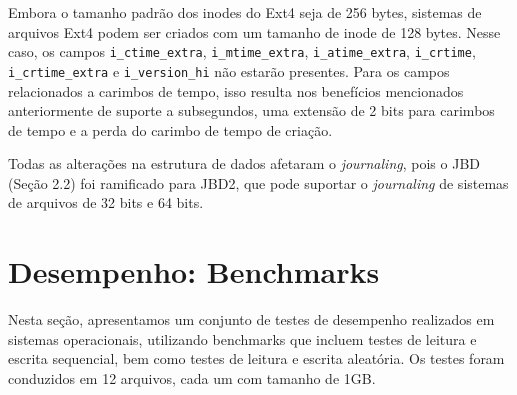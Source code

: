 \documentclass[
	12pt,				%
	openright,			%
	oneside,			%
	a4paper,			%
	chapter=TITLE,		%
	english,			%
	french,				%
	spanish,			%
	brazil				%
	]{abntex2}
\theoremstyle{definition}
\begin{document}
Embora o tamanho padrão dos inodes do Ext4 seja de 256 bytes, sistemas de 
arquivos Ext4 podem ser criados com um tamanho de inode de 128 bytes. Nesse caso, os campos 
\texttt{i\_ctime\_extra}, \texttt{i\_mtime\_extra}, \texttt{i\_atime\_extra}, \texttt{i\_crtime}, 
\texttt{i\_crtime\_extra} e \texttt{i\_version\_hi} não estarão presentes. Para os campos 
relacionados a carimbos de tempo, isso resulta nos benefícios mencionados anteriormente de 
suporte a subsegundos, uma extensão de 2 bits para carimbos de tempo e a perda do carimbo de tempo de criação.

Todas as alterações na estrutura de dados afetaram o \textit{journaling}, pois o JBD (Seção 2.2) 
foi ramificado para JBD2, que pode suportar o \textit{journaling} de sistemas de arquivos de 32 bits e 64 bits.

\chapter{Desempenho: Benchmarks}





\lstset{style=dracula}




Nesta seção, apresentamos um conjunto de testes de desempenho realizados em 
sistemas operacionais, utilizando benchmarks que incluem testes de leitura e 
escrita sequencial, bem como testes de leitura e escrita aleatória. Os testes 
foram conduzidos em 12 arquivos, cada um com tamanho de 1GB.
\end{document}
